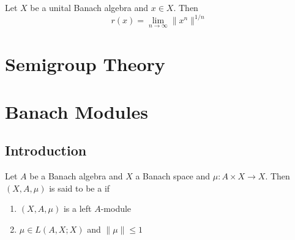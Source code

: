 \documentclass{book}
\begin{document}
	\begin{ex}
		Let $X$ be a unital Banach algebra and $x \in X$. Then 
		$$r(x) = \lim_{n \rightarrow \infty} \|x^n\|^{1/n}$$
	\end{ex}





































\newpage
\chapter{Semigroup Theory}
	
	
	
	
	
	
	
	
	
	
	
	
	
	
	
	
	
	
	
	
	
	
	
	
	
	
	
	
	
	
	
	\newpage
	
	\chapter{Banach Modules}
	
	\section{Introduction}
	
	\begin{defn}
		Let $A$ be a Banach algebra and $X$ a Banach space and $\mu: A \times X \rightarrow X$. Then $(X, A, \mu)$ is said to be a  if 
		\begin{enumerate}
			\item $(X, A, \mu)$ is a left $A$-module
			\item $\mu \in L(A, X; X)$ and $\|\mu\| \leq 1$
		\end{enumerate}
	\end{defn}
	
\end{document}
